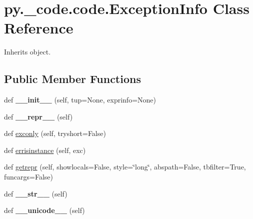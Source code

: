 \hypertarget{classpy_1_1__code_1_1code_1_1_exception_info}{}\section{py.\+\_\+code.\+code.\+Exception\+Info Class Reference}
\label{classpy_1_1__code_1_1code_1_1_exception_info}


Inherits object.

\subsection*{Public Member Functions}
\begin{DoxyCompactItemize}
\item 
\mbox{\label{classpy_1_1__code_1_1code_1_1_exception_info_aaea77e68a7e88b1f756b7cb4cb032206}} 
def {\bfseries \+\_\+\+\_\+init\+\_\+\+\_\+} (self, tup=None, exprinfo=None)
\item 
\mbox{\label{classpy_1_1__code_1_1code_1_1_exception_info_a4f83e2de3ac3385fc548349f7424bc36}} 
def {\bfseries \+\_\+\+\_\+repr\+\_\+\+\_\+} (self)
\item 
def \hyperlink{classpy_1_1__code_1_1code_1_1_exception_info_ab69ed52d921c39d1bd51c3503c9ada42}{exconly} (self, tryshort=False)
\item 
def \hyperlink{classpy_1_1__code_1_1code_1_1_exception_info_a189744015e10339feec4bdc28591049b}{errisinstance} (self, exc)
\item 
def \hyperlink{classpy_1_1__code_1_1code_1_1_exception_info_a57953e48c7a0f5109f4628fb6746a36d}{getrepr} (self, showlocals=False, style=\char`\"{}long\char`\"{}, abspath=False, tbfilter=True, funcargs=False)
\item 
\mbox{\label{classpy_1_1__code_1_1code_1_1_exception_info_af5d601c778456b1faa0dd1f665dfd6b0}} 
def {\bfseries \+\_\+\+\_\+str\+\_\+\+\_\+} (self)
\item 
\mbox{\label{classpy_1_1__code_1_1code_1_1_exception_info_a1c977e305060aa28cf2482337f752d38}} 
def {\bfseries \+\_\+\+\_\+unicode\+\_\+\+\_\+} (self)
\end{DoxyCompactItemize}
